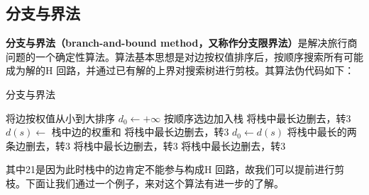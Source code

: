 \documentclass[11pt,a4paper,openany]{book}
\begin{document}
\subsection{分支与界法}
\indent \textbf{分支与界法（branch-and-bound method，又称作分支限界法）}是解决旅行商问题的一个确定性算法。算法基本思想是对边按权值排序后，按顺序搜索所有可能成为解的H 回路，并通过已有解的上界对搜索树进行剪枝。其算法伪代码如下：\\
\begin{algorithm}[!htb]
\renewcommand{\algorithmicrequire}{\textbf{Input:}}
\renewcommand\algorithmicensure {\textbf{Output:} }
    \caption{分支与界法}
    \label{alg:6}%
    \begin{algorithmic}[1]
      \label{alg:babm}  %
      \STATE 将边按权值从小到大排序
      \STATE $d_0\leftarrow +\infty$
         \STATE 按顺序选边加入栈
       \ELSE
          \STATE 将栈中最长边删去，转3
       \ENDIF
       \STATE $d(s)\leftarrow$ 栈中边的权重和
            \STATE 将栈中最长边删去，转3
       \ENDIF
               \STATE $d_0\leftarrow d(s)$
               \STATE 将栈中最长的两条边删去，转3
            \ELSE
                \STATE 将栈中最长边删去，转3
            \ENDIF
       \ELSE
            \STATE 将栈中最长边删去，转3
        \ENDIF
       \ENDIF
      \ENDWHILE
    \end{algorithmic}
\end{algorithm}
\indent 其中21是因为此时栈中的边肯定不能参与构成H 回路，故我们可以提前进行剪枝。下面让我们通过一个例子，来对这个算法有进一步的了解。\\
\end{document}
